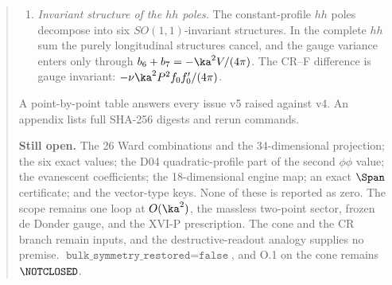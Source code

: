 \begin{abstract}
\begin{enumerate}[label=\textup{(\arabic*)},leftmargin=1.6em]
\item \emph{Invariant structure of the \(hh\) poles.}
The constant-profile \(hh\) poles decompose into six
\(SO(1,1)\)-invariant structures.
In the complete \(hh\) sum the purely longitudinal structures
cancel, and the gauge variance enters only through
\(b_6+b_7=-\ka^2V/(4\pi)\).
The CR--F difference is gauge invariant:
\(-\nu\ka^2P^2f_0f_0'/(4\pi)\).
\end{enumerate}
A point-by-point table answers every issue v5 raised against v4.
An appendix lists full SHA-256 digests and rerun commands.

\smallskip\noindent\textbf{Still open.}
The 26 Ward combinations and the 34-dimensional projection;
the six exact values;
the D04 quadratic-profile part of the second \(\phi\phi\) value;
the evanescent coefficients;
the 18-dimensional engine map;
an exact \(\Span\) certificate;
and the vector-type keys.
None of these is reported as zero.
The scope remains one loop at \(O(\ka^2)\), the massless two-point
sector, frozen de Donder gauge, and the XVI-P prescription.
The cone and the CR branch remain inputs, and the
destructive-readout analogy supplies no premise.
\(\texttt{bulk\_symmetry\_restored}=\texttt{false}\), and
O.1 on the cone remains \(\NOTCLOSED\).
\end{abstract}
